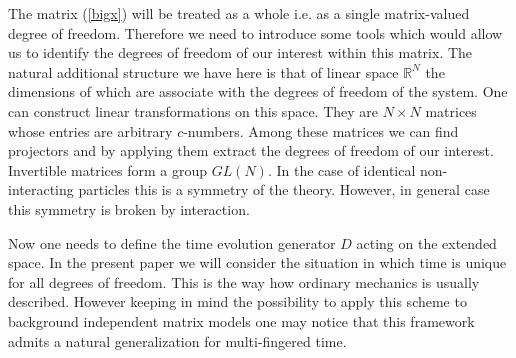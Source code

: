 \documentclass[a4paper,11pt]{article}
\begin{document}
 The matrix (\ref{bigx}) will be
treated as a whole i.e. as a single matrix-valued degree of
freedom.  Therefore we need to introduce some tools which would
allow us to identify the degrees of freedom of our interest within
this matrix. The natural additional structure we have here is that
of linear space $\mathbb{R}^N$ the dimensions of which are
associate with the degrees of freedom of the system. One can
construct linear transformations on this space. They are $N \times
N$ matrices whose entries are arbitrary $c$-numbers. Among these
matrices we can find projectors and by applying them extract the
degrees of freedom of our interest. Invertible matrices form a
group $GL(N)$. In the case of identical non-interacting particles
this is a symmetry of the theory. However, in general case this
symmetry is broken by interaction.


Now one needs to define the time evolution generator $D$ acting on
the extended space. In the present paper we will consider the
situation in which time is unique for all degrees of freedom. This
is the way how ordinary mechanics is usually described. However
keeping in mind the possibility to apply this scheme to background
independent matrix models one may notice that this framework
admits a natural generalization for multi-fingered time.
\end{document}
